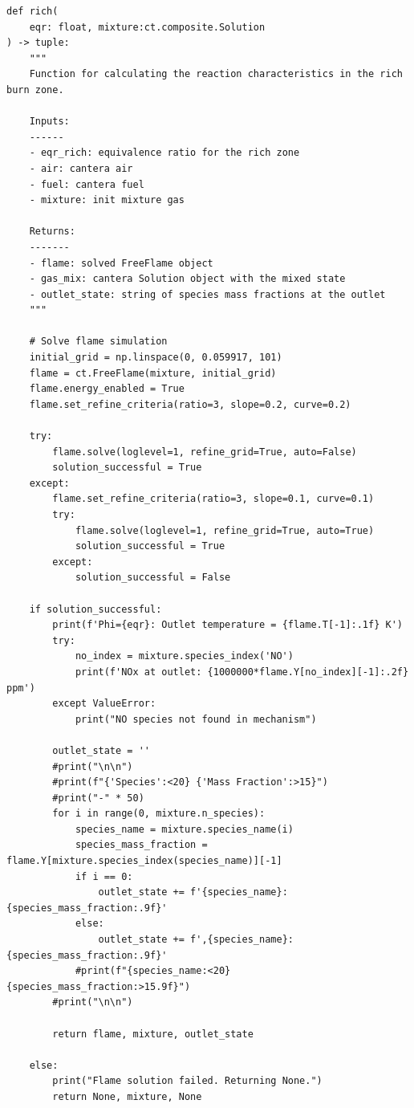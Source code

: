 \begin{verbatim}
def rich(
    eqr: float, mixture:ct.composite.Solution
) -> tuple:
    """
    Function for calculating the reaction characteristics in the rich burn zone.
   
    Inputs:
    ------
    - eqr_rich: equivalence ratio for the rich zone
    - air: cantera air
    - fuel: cantera fuel
    - mixture: init mixture gas
   
    Returns:
    -------
    - flame: solved FreeFlame object
    - gas_mix: cantera Solution object with the mixed state
    - outlet_state: string of species mass fractions at the outlet
    """

    # Solve flame simulation
    initial_grid = np.linspace(0, 0.059917, 101)
    flame = ct.FreeFlame(mixture, initial_grid)
    flame.energy_enabled = True
    flame.set_refine_criteria(ratio=3, slope=0.2, curve=0.2)
    
    try:
        flame.solve(loglevel=1, refine_grid=True, auto=False)
        solution_successful = True
    except:
        flame.set_refine_criteria(ratio=3, slope=0.1, curve=0.1)
        try:
            flame.solve(loglevel=1, refine_grid=True, auto=True)
            solution_successful = True
        except:
            solution_successful = False
    
    if solution_successful:
        print(f'Phi={eqr}: Outlet temperature = {flame.T[-1]:.1f} K')
        try:
            no_index = mixture.species_index('NO')
            print(f'NOx at outlet: {1000000*flame.Y[no_index][-1]:.2f} ppm')
        except ValueError:
            print("NO species not found in mechanism")

        outlet_state = ''
        #print("\n\n")
        #print(f"{'Species':<20} {'Mass Fraction':>15}")
        #print("-" * 50)
        for i in range(0, mixture.n_species):
            species_name = mixture.species_name(i)
            species_mass_fraction = flame.Y[mixture.species_index(species_name)][-1]
            if i == 0:
                outlet_state += f'{species_name}:{species_mass_fraction:.9f}'
            else:
                outlet_state += f',{species_name}:{species_mass_fraction:.9f}'
            #print(f"{species_name:<20} {species_mass_fraction:>15.9f}")
        #print("\n\n")

        return flame, mixture, outlet_state
    
    else:
        print("Flame solution failed. Returning None.")
        return None, mixture, None

\end{verbatim}

